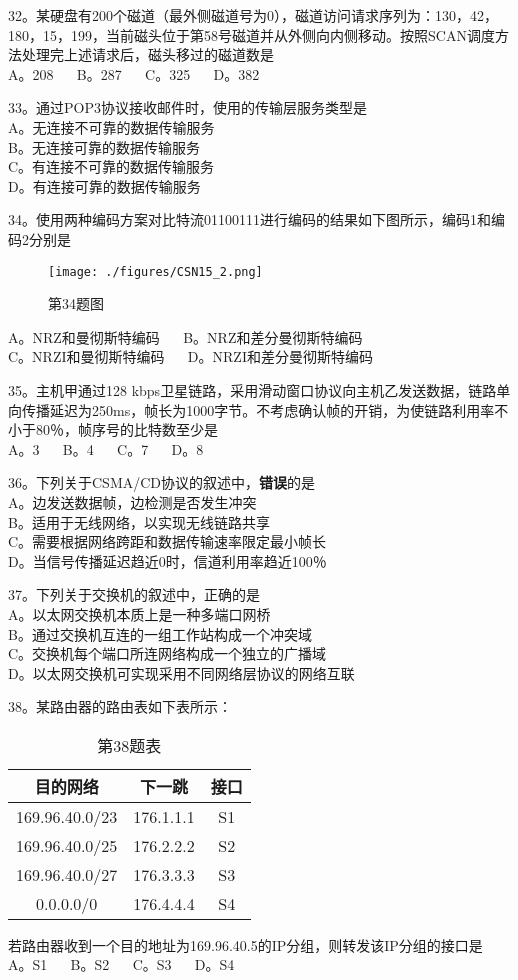 32。某硬盘有200个磁道（最外侧磁道号为0），磁道访问请求序列为：130，42，180，15，199，当前磁头位于第58号磁道并从外侧向内侧移动。按照SCAN调度方法处理完上述请求后，磁头移过的磁道数是 \\
A。208 $\quad$ B。287 $\quad$ C。325 $\quad$ D。382

33。通过POP3协议接收邮件时，使用的传输层服务类型是 \\
A。无连接不可靠的数据传输服务 \\
B。无连接可靠的数据传输服务 \\
C。有连接不可靠的数据传输服务 \\
D。有连接可靠的数据传输服务

34。使用两种编码方案对比特流01100111进行编码的结果如下图所示，编码1和编码2分别是
\begin{figure}[ht]
\centering
\texttt{[image: ./figures/CSN15\_2.png]}
\caption{第34题图} \label{CSN15_fig2}
\end{figure}
A。NRZ和曼彻斯特编码 $\quad$ B。NRZ和差分曼彻斯特编码 \\
C。NRZI和曼彻斯特编码 $\quad$ D。NRZI和差分曼彻斯特编码

35。主机甲通过128 kbps卫星链路，采用滑动窗口协议向主机乙发送数据，链路单向传播延迟为250ms，帧长为1000字节。不考虑确认帧的开销，为使链路利用率不小于80％，帧序号的比特数至少是 \\
A。3 $\quad$ B。4 $\quad$ C。7 $\quad$ D。8

36。下列关于CSMA/CD协议的叙述中，\textbf{错误}的是 \\
A。边发送数据帧，边检测是否发生冲突 \\
B。适用于无线网络，以实现无线链路共享 \\
C。需要根据网络跨距和数据传输速率限定最小帧长 \\
D。当信号传播延迟趋近0时，信道利用率趋近100％

37。下列关于交换机的叙述中，正确的是 \\
A。以太网交换机本质上是一种多端口网桥 \\
B。通过交换机互连的一组工作站构成一个冲突域 \\
C。交换机每个端口所连网络构成一个独立的广播域 \\
D。以太网交换机可实现采用不同网络层协议的网络互联

38。某路由器的路由表如下表所示：
\begin{table}[ht]
\centering
\caption{第38题表}\label{CSN15_tab1}
\begin{tabular}{|c|c|c|}
\hline
目的网络 & 下一跳 & 接口 \\
\hline
169.96.40.0/23 & 176.1.1.1 & S1 \\
\hline
169.96.40.0/25 & 176.2.2.2 & S2 \\
\hline
169.96.40.0/27 & 176.3.3.3 & S3 \\
\hline
0.0.0.0/0 & 176.4.4.4 & S4 \\
\hline
\end{tabular}
\end{table}
若路由器收到一个目的地址为169.96.40.5的IP分组，则转发该IP分组的接口是 \\
A。S1 $\quad$ B。S2 $\quad$ C。S3 $\quad$ D。S4

